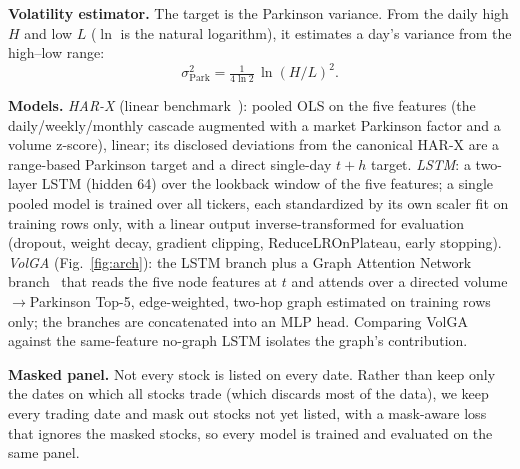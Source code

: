 \documentclass[runningheads]{llncs}
\begin{document}
\textbf{Volatility estimator.} The target is the Parkinson variance. From the daily high $H$ and low
$L$ ($\ln$ is the natural logarithm), it estimates a day's variance from the high--low range:
\[
\sigma^2_{\mathrm{Park}} = \tfrac{1}{4\ln 2}\,\ln(H/L)^2 .
\]

\textbf{Models.} \emph{HAR-X} (linear benchmark~\cite{corsi2009,clements2024}): pooled OLS on the five
features (the daily/weekly/monthly cascade augmented with a market Parkinson factor and a volume
z-score), linear; its disclosed deviations from the canonical HAR-X are a range-based Parkinson target
and a direct single-day $t{+}h$ target. \emph{LSTM}: a two-layer LSTM (hidden 64) over the lookback
window of the five features; a single pooled model is trained over all tickers, each standardized by
its own scaler fit on training rows only, with a linear output inverse-transformed for evaluation
(dropout, weight decay, gradient clipping, ReduceLROnPlateau, early stopping). \emph{VolGA}
(Fig.~\ref{fig:arch}): the LSTM branch plus a Graph Attention Network branch~\cite{gat2018} that reads
the five node features at $t$ and attends over a directed volume$\to$Parkinson Top-5, edge-weighted,
two-hop graph estimated on training rows only; the branches are concatenated into an MLP head.
Comparing VolGA against the same-feature no-graph LSTM isolates the graph's contribution.

\textbf{Masked panel.} Not every stock is listed on every date. Rather than keep only the dates on
which all stocks trade (which discards most of the data), we keep every trading date and mask out
stocks not yet listed, with a mask-aware loss that ignores the masked stocks, so every model is
trained and evaluated on the same panel.
\end{document}
